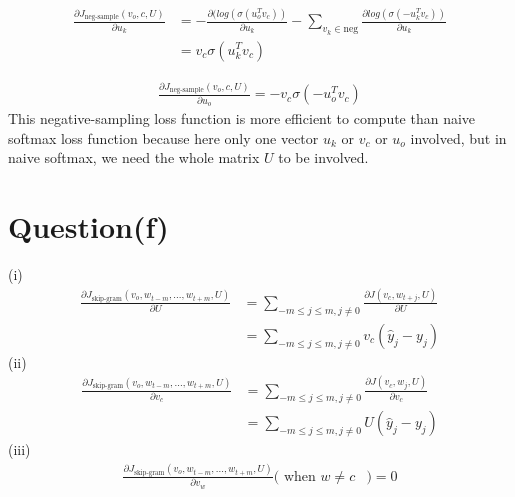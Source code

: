 \documentclass[11pt]{article}
\begin{document}
\begin{equation}
\begin{aligned}
\frac{\partial J_{\text{neg-sample}}(v_o, c, U)}{\partial u_k} &= -\frac{\partial(log(\sigma(u_o^Tv_c))}{\partial u_k} - \sum_{v_k \in \text{neg}}\frac{\partial log(\sigma(-u_k^Tv_c))}{\partial u_k}\\
&= v_c\sigma(u_k^Tv_c)
\end{aligned}
\end{equation} 

\begin{equation}
\begin{aligned}
\frac{\partial J_{\text{neg-sample}}(v_o, c, U)}{\partial u_o} = -v_c\sigma(-u_o^Tv_c)
\end{aligned}
\end{equation} 
This negative-sampling loss function is more efficient to compute than naive softmax loss function because here only one vector $u_k$ or $v_c$ or $u_o$ involved, but in naive softmax, we need the whole matrix $U$ to be involved.
\section{Question(f)}
(i) \begin{equation}
\begin{aligned}
\frac{\partial J_{\text{skip-gram}}(v_o, w_{t-m}, ... , w_{t+m}, U)}{\partial U} &=
\sum_{-m \le j \le m, j \ne 0}\frac{\partial J(v_c, w_{t+j}, U)}{\partial U} \\
&= \sum_{-m \le j \le m, j \ne 0}v_{c}(\hat y_j - y_j) 
\end{aligned}
\end{equation} 
(ii) \begin{equation}
\begin{aligned}
\frac{\partial J_{\text{skip-gram}}(v_o, w_{t-m}, ... , w_{t+m}, U)}{\partial v_c} &= \sum_{-m \le j \le m, j \ne 0} \frac{\partial J(v_c, w_j, U)}{\partial v_c} \\ &= \sum_{-m \le j \le m, j \ne 0}U(\hat y_j - y_j)
\end{aligned}
\end{equation} 
(iii) \begin{equation}
\begin{aligned}
\frac{\partial J_{\text{skip-gram}}(v_o, w_{t-m}, ... , w_{t+m}, U)}{\partial v_w} (\text{ when } w \ne c &)= 0
\end{aligned}
\end{equation} 
\end{document}
